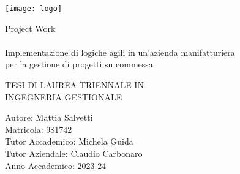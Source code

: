 \begin{titlepage}
	\texttt{[image: logo]}
	\vspace{4cm}

\huge \textcolor{poliblu}{Project Work\\}
\vspace{0.5cm}
\large \textcolor{poliblu}{\\Implementazione di logiche agili in un'azienda manifatturiera\\per la gestione di progetti su commessa}

	\vspace{1cm}
	\large
	\textcolor{poliblu}{TESI DI LAUREA TRIENNALE IN \\ INGEGNERIA GESTIONALE \\ }
	\vspace{1cm}

	\large{Autore: Mattia Salvetti\\}
	\vfill
	\normalsize
	Matricola: 981742\\
	Tutor Accademico: Michela Guida\\
	Tutor Aziendale: Claudio Carbonaro\\
	Anno Accademico: 2023-24

\end{titlepage}
